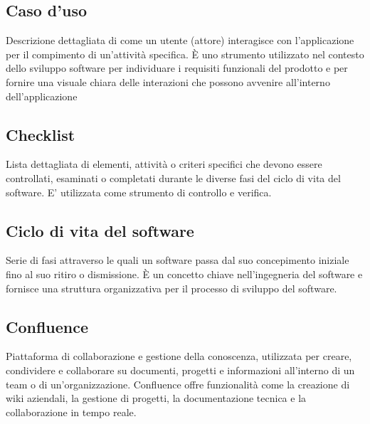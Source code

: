 \hypertarget{sec:caso_uso}{}
\subsection*{Caso d'uso}
Descrizione dettagliata di come un utente (attore) interagisce con l'applicazione per il compimento di un'attività specifica. È uno strumento utilizzato nel 
contesto dello sviluppo software per individuare i requisiti funzionali del prodotto e per fornire una visuale chiara delle interazioni che possono avvenire 
all'interno dell'applicazione

\subsection*{Checklist}
Lista dettagliata di elementi, attività o criteri specifici che devono essere controllati, esaminati o completati durante le diverse fasi del ciclo di vita 
del software. E' utilizzata come strumento di controllo e verifica.

\hypertarget{sec:ciclo_di_vita}{}
\subsection*{Ciclo di vita del software}
Serie di fasi attraverso le quali un software passa dal suo concepimento iniziale fino al suo ritiro o dismissione. È un concetto chiave nell'ingegneria 
del software e fornisce una struttura organizzativa per il processo di sviluppo del software.

\hypertarget{sec:confluence}{}
\subsection*{Confluence}
Piattaforma di collaborazione e gestione della conoscenza, utilizzata per creare, condividere e collaborare su documenti, progetti e informazioni all'interno 
di un team o di un'organizzazione. Confluence offre funzionalità come la creazione di wiki aziendali, la gestione di progetti, la documentazione tecnica e la 
collaborazione in tempo reale.

\newpage